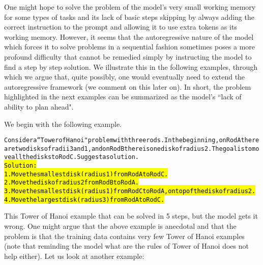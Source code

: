 One might hope to solve the problem of the model's very small working memory for some types of tasks and its lack of basic steps skipping by always adding the correct instruction to the prompt and allowing it to use extra tokens as its working memory. However, it seems that the autoregressive nature of the model which forces it to solve problems in a sequential fashion sometimes poses a more profound difficulty that cannot be remedied simply by instructing the model to find a step by step solution. We illustrate this in the following examples, through which we argue that, quite possibly, one would eventually need to extend the autoregressive framework (we comment on this later on). In short, the problem highlighted in the next examples can be summarized as the model's ``lack of ability to plan ahead".

We begin with the following example.

\begin{AIbox}{\DV}
\scriptsize\vspace{-5px}
\parbox{1\textwidth}{
\begin{alltt}

Consider a ``Tower of Hanoi" problem with three rods. In the beginning, on Rod A there are two disks of radii 3 and 1, and on Rod B there is one disk of radius 2. The goal is to move all the disks to Rod C. Suggest a solution. \\

\hl{Solution: \\
1. Move the smallest disk (radius 1) from Rod A to Rod C. \\
2. Move the disk of radius 2 from Rod B to Rod A. \\
3. Move the smallest disk (radius 1) from Rod C to Rod A, on top of the disk of radius 2. \\
4. Move the largest disk (radius 3) from Rod A to Rod C.}

\end{alltt}
}
\end{AIbox}
This Tower of Hanoi example that can be solved in 5 steps, but the model gets it wrong. One might argue that the above example is anecdotal and that the problem is that the training data contains very few Tower of Hanoi examples (note that reminding the model what are the rules of Tower of Hanoi does not help either). Let us look at another example:


